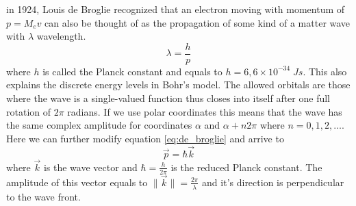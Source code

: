 %
%


in 1924, Louis de Broglie recognized that an electron moving with momentum of $p=M_ev$ can also be thought of as the propagation of some kind of a matter wave with $\lambda$ wavelength.
\begin{equation}
	\label{eq:de_broglie}
	\lambda = \frac{h}{p}
\end{equation}
where $h$ is called the Planck constant and equals to $h = 6,6 \times 10^{-34}\;Js$.
This also explains the discrete energy levels in Bohr's model.
The allowed orbitals are those where the wave is a single-valued function thus closes into itself after one full rotation of $2\pi$ radians.
If we use polar coordinates this means that the wave has the same complex amplitude for coordinates $\alpha$ and $\alpha + n2\pi$ where $n = 0, 1, 2, \dots$.
Here we can further modify equation \ref{eq:de_broglie} and arrive to
\begin{equation}
	\vec{p} = \hbar \vec{k}
\end{equation}
where $\vec{k}$ is the wave vector and $\hbar = \frac{h}{2\pi}$ is the reduced Planck constant.
The amplitude of this vector equals to $\|\vec{k}\|= \frac{2\pi}{\lambda}$ and it's direction is perpendicular to the wave front.

